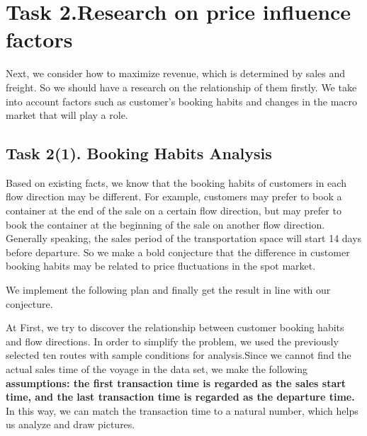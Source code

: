 \section{Task 2.Research on price influence factors}
Next, we consider how to maximize revenue, which is determined by sales and freight. So we should have a research on the relationship of them firstly. We take into account factors such as customer's booking habits and changes in the macro market that will play a role.

\subsection{Task 2(1). Booking Habits Analysis}

Based on existing facts, we know that the booking habits of customers in each flow direction may be different. For example, customers may prefer to book a container at the end of the sale on a certain flow direction, but may prefer to book the container at the beginning of the sale on another flow direction. Generally speaking, the sales period of the transportation space will start 14 days before departure. So we make a bold conjecture that the difference in customer booking habits may be related to price fluctuations in the spot market.

We implement the following plan and finally get the result in line with our conjecture.

At First, we try to discover the relationship between customer booking habits and flow directions. In order to simplify the problem, we used the previously selected ten routes with sample conditions for analysis.Since we cannot find the actual sales time of the voyage in the data set, we make the following \textbf{assumptions: the first transaction time is regarded as the sales start time, and the last transaction time is regarded as the departure time.} In this way, we can match the transaction time to a natural number, which helps us analyze and draw pictures.

